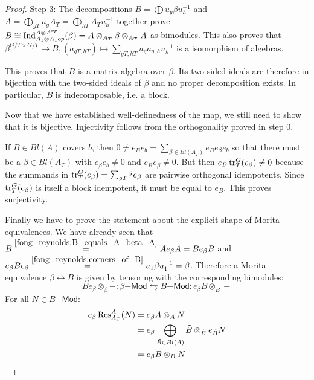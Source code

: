 \begin{proof}
\smallbreak
Step 3: The decompositions $B=\bigoplus u_g\beta u_h^{-1}$ and $A=\bigoplus_{g T} u_g A_T = \bigoplus_{h T} A_T u_h^{-1}$ together prove $B\cong\operatorname{Ind}_{A_1\otimes A_1 {op}}^{A\otimes A^{op}}(\beta)=A\otimes_{A_T} \beta \otimes_{A_T} A$ as bimodules. This also proves that $\beta^{ G/T\times  G/T} \to B, (a_{gT,hT}) \mapsto \sum_{gT,hT} u_g a_{g,h}u_h^{-1}$ is a isomorphism of algebras.

\smallbreak
This proves that $B$ is a matrix algebra over $\beta$. Its two-sided ideals are therefore in bijection with the two-sided ideals of $\beta$ and no proper decomposition exists. In particular, $B$ is indecomposable, i.e. a block.

\medbreak
Now that we have established well-definedness of the map, we still need to show that it is bijective. Injectivity follows from the orthogonality proved in step 0.

If $B\in Bl(A)$ covers $b$, then $0\neq e_B e_b = \sum_{\beta\in Bl(A_T)} e_B e_\beta e_b$ so that there must be a $\beta\in Bl(A_T)$ with $e_\beta e_b\neq 0$ and $e_B e_\beta \neq 0$. But then $e_B \operatorname{tr}_T^G(e_\beta) \neq 0$ because the summands in $\operatorname{tr}_T^G(e_\beta)=\sum_{g T} {^g e_\beta}$ are pairwise orthogonal idempotents. Since $\operatorname{tr}_T^G(e_\beta)$ is itself a block idempotent, it must be equal to $e_B$. This proves surjectivity.

\medbreak
Finally we have to prove the statement about the explicit shape of Morita equivalences. We have already seen that $B \overset{\eqref{fong_reynolds:B_equals_A_beta_A}}{=} Ae_\beta A=Be_\beta B$ and $e_\beta B e_\beta \overset{\eqref{fong_reynolds:corners_of_B}}{=} u_1 \beta u_1^{-1} = \beta$. Therefore a Morita equivalence $\beta \leftrightarrow B$ is given by tensoring with the corresponding bimodules:
\[ Be_\beta \otimes_{\beta} - : \beta\mathsf{-Mod} \leftrightarrows B\mathsf{-Mod} : e_\beta B \otimes_B - \]
For all $N\in B\mathsf{-Mod}$:
\begin{align*}
e_\beta \operatorname{Res}_{A_T}^A(N) &= e_\beta A \otimes_A N \\
&= e_\beta \bigoplus_{\tilde{B}\in Bl(A)} \tilde{B} \otimes_{\tilde{B}} e_{\tilde{B}} N \\
&= e_\beta B\otimes_B N
\end{align*}


\end{proof}
